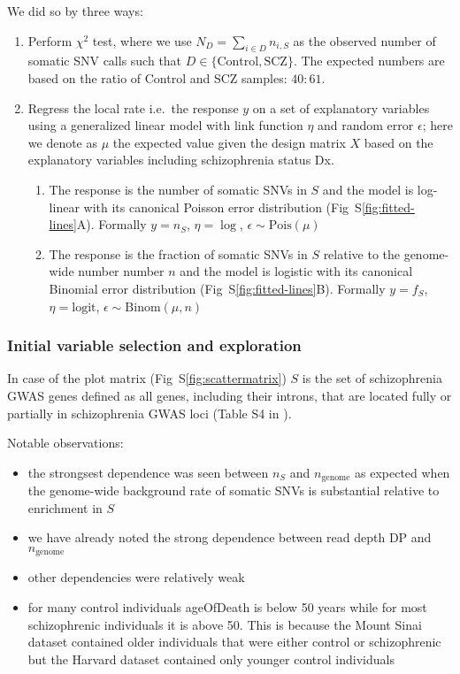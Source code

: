 \documentclass[letterpaper]{article}
\begin{document}
We did so by three ways:
\begin{enumerate}
\item Perform $\chi^2$ test, where we use $N_D = \sum_{i\in D} n_{i,S}$ as the observed number
	of somatic SNV calls such that $D \in \{\mathrm{Control},
	\mathrm{SCZ}\}$.  The expected numbers are based on the ratio of
	Control and SCZ samples: $40:61$.
\item Regress the local rate i.e.~the response $y$ on a set of explanatory variables
	using a generalized linear model with link function $\eta$ and random error
	$\epsilon$; here we denote as $\mu$
	the expected value given the design matrix $X$ based on the
	explanatory variables including schizophrenia status Dx.
\begin{enumerate}
\item The response is the number of somatic SNVs in $S$ and the model is
	log-linear with its canonical Poisson error distribution
	(Fig~S\ref{fig:fitted-lines}A).  Formally $y
	= n_S$, $\eta = \log$, $\epsilon \sim \mathrm{Pois}(\mu)$
\item The response is the fraction of somatic SNVs in $S$ relative to the
	genome-wide number number $n$ and the model is
	logistic with its canonical Binomial error distribution (Fig~S\ref{fig:fitted-lines}B).  Formally $y
	= f_S$, $\eta = \mathrm{logit}$, $\epsilon \sim \mathrm{Binom}(\mu, n)$
\end{enumerate}
\end{enumerate}

\subsubsection*{Initial variable selection and exploration}

In case of the plot matrix (Fig~S\ref{fig:scattermatrix}) \(S\) is the set of schizophrenia GWAS genes
defined as all genes, including their introns, that are located fully or
partially in schizophrenia GWAS loci (Table S4 in \cite{Pardinas2018}).

Notable observations:
\begin{itemize}
	\item the strongsest dependence was seen between \(n_S\) and \(n_\mathrm{genome}\) as expected
		when the genome-wide background rate of somatic SNVs is
		substantial relative to enrichment in \(S\)
	\item we have already noted the strong dependence between read depth DP and
		\(n_\mathrm{genome}\)
        \item other dependencies were relatively weak
	\item for many control individuals ageOfDeath is below 50 years while for
		most schizophrenic individuals it is above 50.  This is
		because the Mount Sinai dataset contained older individuals
		that were either control or schizophrenic but the Harvard dataset contained
		only younger control individuals
\end{itemize}
\end{document}
